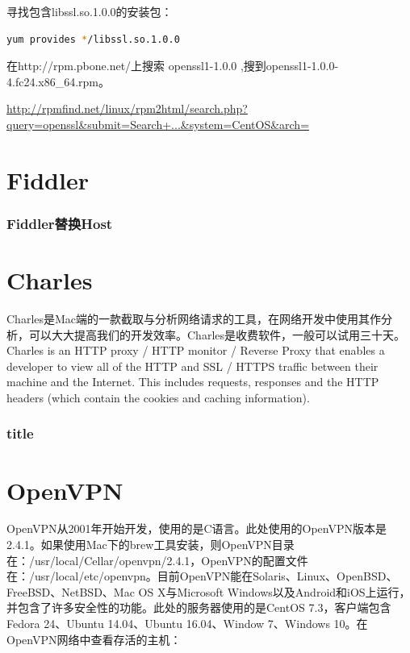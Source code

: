 \documentclass[letter]{book}
\begin{document}
寻找包含libssl.so.1.0.0的安装包：

\begin{lstlisting}[language=bash]
yum provides */libssl.so.1.0.0
\end{lstlisting}

在http://rpm.pbone.net/上搜索 openssl1-1.0.0 ,搜到openssl1-1.0.0-4.fc24.x86\_64.rpm。

\url{http://rpmfind.net/linux/rpm2html/search.php?query=openssl&submit=Search+...&system=CentOS&arch=}

\chapter{Fiddler}

\subsection{Fiddler替换Host}

\chapter{Charles}

Charles是Mac端的一款截取与分析网络请求的工具，在网络开发中使用其作分析，可以大大提高我们的开发效率。Charles是收费软件，一般可以试用三十天。Charles is an HTTP proxy / HTTP monitor / Reverse Proxy that enables a developer to view all of the HTTP and SSL / HTTPS traffic between their machine and the Internet. This includes requests, responses and the HTTP headers (which contain the cookies and caching information).

\subsection{title}


\chapter{OpenVPN}

OpenVPN从2001年开始开发，使用的是C语言。此处使用的OpenVPN版本是2.4.1。如果使用Mac下的brew工具安装，则OpenVPN目录在：/usr/local/Cellar/openvpn/2.4.1，OpenVPN的配置文件在：/usr/local/etc/openvpn。目前OpenVPN能在Solaris、Linux、OpenBSD、FreeBSD、NetBSD、Mac OS X与Microsoft Windows以及Android和iOS上运行，并包含了许多安全性的功能。此处的服务器使用的是CentOS 7.3，客户端包含Fedora 24、Ubuntu 14.04、Ubuntu 16.04、Window 7、Windows 10。在OpenVPN网络中查看存活的主机：
\end{document}
